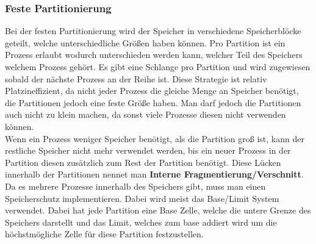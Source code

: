 \documentclass{article}
\begin{document}
	\subsubsection{Feste Partitionierung}
	Bei der festen Partitionierung wird der Speicher in verschiedene Speicherblöcke geteilt, welche unterschiedliche Größen haben können. Pro Partition ist ein Prozess erlaubt wodurch unterschieden werden kann, welcher Teil des Speichers welchem Prozess gehört. Es gibt eine Schlange pro Partition und wird zugewiesen sobald der nächste Prozess an der Reihe ist. Diese Strategie ist relativ Platzineffizient, da nicht jeder Prozess die gleiche Menge an Speicher benötigt, die Partitionen jedoch eine feste Größe haben. Man darf jedoch die Partitionen auch nicht zu klein machen, da sonst viele Prozesse diesen nicht verwenden können.\\
	Wenn ein Prozess weniger Speicher benötigt, als die Partition groß ist, kann der restliche Speicher nicht mehr verwendet werden, bis ein neuer Prozess in der Partition diesen zusätzlich zum Rest der Partition benötigt. Diese Lücken innerhalb der Partitionen nennet man \textbf{Interne Fragmentierung/Verschnitt}. \\
	Da es mehrere Prozesse innerhalb des Speichers gibt, muss man einen Speicherschutz implementieren. Dabei wird meist das Base/Limit System verwendet. Dabei hat jede Partition eine Base Zelle, welche die untere Grenze des Speichers darstellt und das Limit, welches zum base addiert wird um die höchstmögliche Zelle für diese Partition festzustellen.
\end{document}

